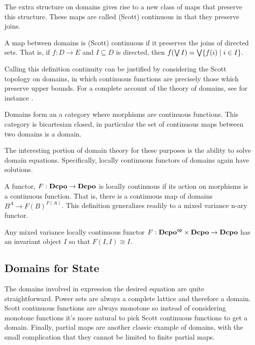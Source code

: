 The extra structure on domains gives rise to a new class of maps that
preserve this structure. These maps are called (Scott) continuous in
that they preserve joins.
\begin{defn}
  A map between domains is (Scott) continuous if it preserves the
  joins of directed sets. That is, if $f : D \to E$ and
  $I \subseteq D$ is directed, then
  $f(\bigvee I) = \bigvee \{f(i) \mid i \in I\}$.
\end{defn}
Calling this definition continuity can be justified by considering the
Scott topology on domains, in which continuous functions are precisely
those which preserve upper bounds. For a complete account of the
theory of domains, see for instance \citet{TODO-COMPEDIUM}.
\begin{thm}
  Domains form an a category where morphisms are continuous
  functions. This category is bicartesian closed, in particular the
  set of continuous maps between two domains is a domain.
\end{thm}
The interesting portion of domain theory for these purposes is the
ability to solve domain equations. Specifically, locally continuous
functors of domains again have solutions.
\begin{defn}
  A functor, $F : \mathbf{Dcpo} \to \mathbf{Dcpo}$ is locally continuous if its action
  on morphisms is a continuous function. That is, there is a
  continuous map of domains $B^A \to F(B)^{F(A)}$. This definition
  generalizes readily to a mixed variance n-ary functor.
\end{defn}
\begin{thm}\label{thm:domains:fixed-points}
  Any mixed variance locally continuous functor
  $F : \mathbf{Dcpo}^{\mathsf{op}} \times \mathbf{Dcpo} \to \mathbf{Dcpo}$ has an invariant object $I$
  so that $F(I, I) \cong I$.
\end{thm}

\subsection{Domains for State}

The domains involved in expression the desired equation are quite
straightforward. Power sets are always a complete lattice and
therefore a domain. Scott continuous functions are always monotone so
instead of considering monotone functions it's more natural to pick
Scott continuous functions to get a domain. Finally, partial maps are
another classic example of domains, with the small complication that
they cannot be limited to finite partial maps.

